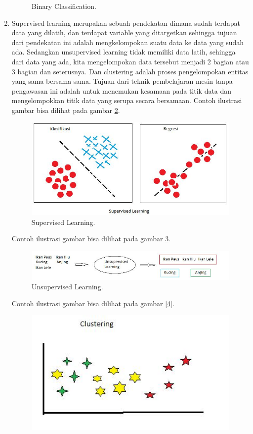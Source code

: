 \begin{enumerate}
\begin{figure}[!htbp]
		\caption{Binary Classification.}
		\label{1}
\end{figure}
\item Supervised learning merupakan sebuah pendekatan dimana sudah terdapat data yang dilatih, dan terdapat variable yang ditargetkan sehingga tujuan dari pendekatan ini adalah mengkelompokan suatu data ke data yang sudah ada. Sedangkan unsupervised learning tidak memiliki data latih, sehingga dari data yang ada, kita mengelompokan data tersebut menjadi 2 bagian atau 3 bagian dan seterusnya. Dan clustering adalah proses pengelompokan entitas yang sama bersama-sama. Tujuan dari teknik pembelajaran mesin tanpa pengawasan ini adalah untuk menemukan kesamaan pada titik data dan mengelompokkan titik data yang serupa secara bersamaan\cite{zhu2009introduction}.
\subitem Contoh ilustrasi gambar bisa dilihat pada gambar \ref{2}.
\begin{figure}[!htbp]
		\centerline{\includegraphics[width=1\textwidth]{figures/huda/supervised.JPG}}
		\caption{Supervised Learning.}
		\label{2}
\end{figure}
\subitem Contoh ilustrasi gambar bisa dilihat  pada gambar \ref{3}.
\begin{figure}[!htbp]
		\centerline{\includegraphics[width=1\textwidth]{figures/huda/unsupervised.JPG}}
		\caption{Unsupervised Learning.}
		\label{3}
\end{figure}
\subitem Contoh ilustrasi gambar bisa dilihat pada gambar \ref{4}.
\begin{figure}[!htbp]
		\centerline{\includegraphics[width=1\textwidth]{figures/huda/clustering.JPG}}

\end{figure}
\end{enumerate}
